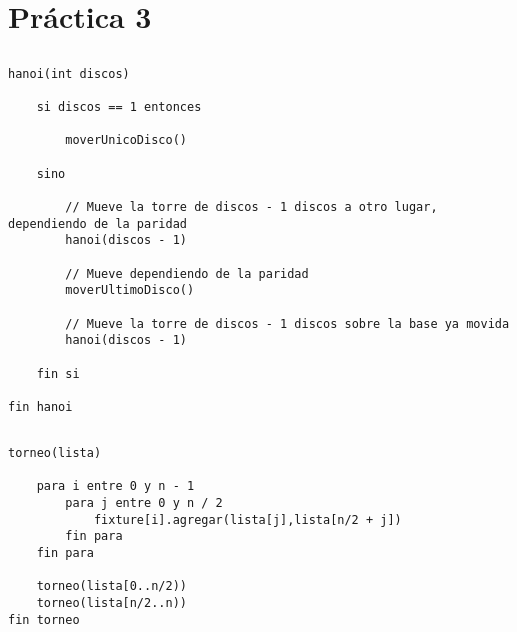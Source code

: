\section{Práctica 3}

\setcounter{subsection}{1}
\subsection{}

\begin{codesnippet}
\begin{verbatim}
hanoi(int discos)

    si discos == 1 entonces

        moverUnicoDisco()

    sino
    
        // Mueve la torre de discos - 1 discos a otro lugar, dependiendo de la paridad
        hanoi(discos - 1)

        // Mueve dependiendo de la paridad
        moverUltimoDisco()

        // Mueve la torre de discos - 1 discos sobre la base ya movida
        hanoi(discos - 1)

    fin si

fin hanoi
\end{verbatim}
\end{codesnippet}

\setcounter{subsection}{3}
\subsection{}

\begin{codesnippet}
\begin{verbatim}
torneo(lista)

    para i entre 0 y n - 1
        para j entre 0 y n / 2
            fixture[i].agregar(lista[j],lista[n/2 + j])
        fin para
    fin para

    torneo(lista[0..n/2))
    torneo(lista[n/2..n))
fin torneo    
\end{verbatim}
\end{codesnippet}

\setcounter{subsection}{6}
\subsection{}
\subsubsection{}

